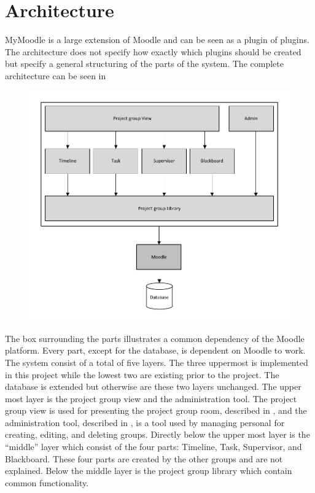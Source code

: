 \section{Architecture}
MyMoodle is a large extension of Moodle and can be seen as a plugin of plugins. 
The architecture does not specify how exactly which plugins should be created but specify a general structuring of the parts of the system. 
The complete architecture can be seen in 
\begin{figure}
	\centering
		\includegraphics{images/architecture.pdf}
	\label{fig:architecture}
\end{figure}
The box surrounding the parts illustrates a common dependency of the Moodle platform. 
Every part, except for the database, is dependent on Moodle to work. 
The system consist of a total of five layers. 
The three uppermost is implemented in this project while the lowest two are existing prior to the project. 
The database is extended but otherwise are these two layers unchanged.
The upper most layer is the project group view and the administration tool.
The project group view is used for presenting the project group room, described in , and the administration tool, described in , is a tool used by managing personal for creating, editing, and deleting groups. 
Directly below the upper most layer is the ``middle'' layer which consist of the four parts: Timeline, Task, Supervisor, and Blackboard. These four parts are created by the other groups and are not explained. 
Below the middle layer is the project group library which contain common functionality.
 

